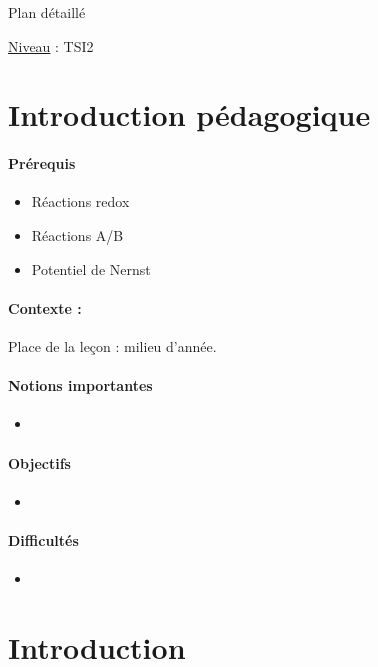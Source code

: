 \begin{reportBlock}{Plan détaillé}

\underline{Niveau} : TSI2 \\

\section*{Introduction pédagogique}


\paragraph*{Prérequis}
\begin{itemize}
\item Réactions redox
\item Réactions A/B
\item Potentiel de Nernst
\end{itemize}

\paragraph*{Contexte :}
Place de la leçon : milieu d'année.

\paragraph*{Notions importantes}

\begin{itemize}
\item 
\end{itemize}

\paragraph*{Objectifs}

\begin{itemize}
\item
\end{itemize}

\paragraph*{Difficultés}

\begin{itemize}
\item
\end{itemize}

\section*{Introduction }


\end{reportBlock}
